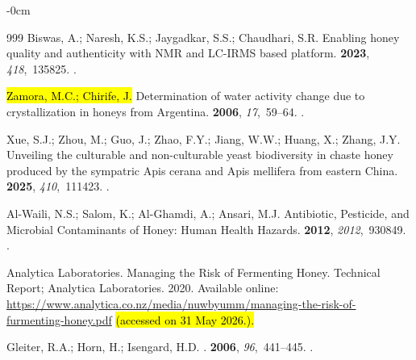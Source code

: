 \documentclass[foods,review,accept,pdftex,moreauthors]{Definitions/mdpi}
\begin{document}
{\begin{adjustwidth}{-\extralength}{0cm}
\begin{thebibliography}{999}
Biswas, A.; Naresh, K.S.; Jaygadkar, S.S.; Chaudhari, S.R.
\newblock Enabling honey quality and authenticity with NMR and LC-IRMS based
  platform.
 {\bf 2023}, {\em 418},~135825.
.

\hl{Zamora, M.C.; Chirife, J.}
\newblock Determination of water activity change due to crystallization in
  honeys from {Argentina}.
 {\bf 2006}, {\em 17},~59--64.
.

Xue, S.J.; Zhou, M.; Guo, J.; Zhao, F.Y.; Jiang, W.W.; Huang, X.; Zhang, J.Y.
\newblock Unveiling the culturable and non-culturable yeast biodiversity in
  chaste honey produced by the sympatric Apis cerana and Apis mellifera from
  eastern China.
 {\bf 2025}, {\em
  410},~111423.
.

Al-Waili, N.S.; Salom, K.; Al-Ghamdi, A.; Ansari, M.J.
\newblock Antibiotic, Pesticide, and Microbial Contaminants of Honey: Human
  Health Hazards.
 {\bf 2012}, {\em 2012},~930849.
.

{Analytica Laboratories}.
\newblock Managing the Risk of Fermenting Honey.
\newblock Technical Report; Analytica Laboratories.  2020.  Available online:  \url{https://www.analytica.co.nz/media/nuwbyumm/managing-the-risk-of-furmenting-honey.pdf}  \hl{(accessed on 31 May 2026.).} %


Gleiter, R.A.; Horn, H.; Isengard, H.D.
.
 {\bf 2006}, {\em 96},~441--445.
.


\end{thebibliography}
\end{adjustwidth}}
\end{document}
